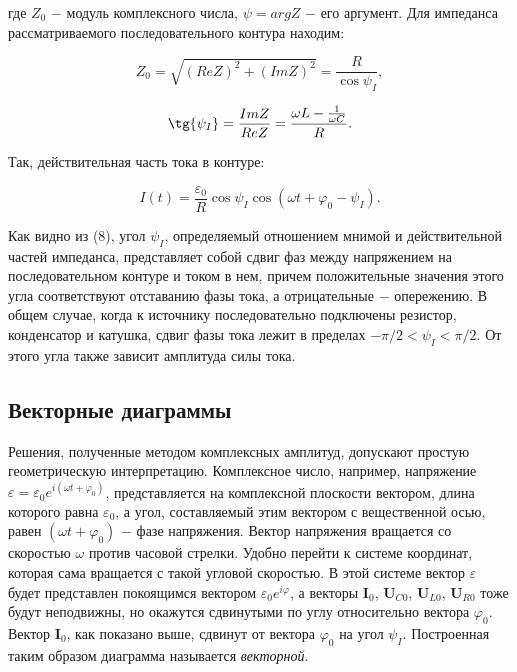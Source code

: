 \documentclass[a4paper,12pt]{article} %
\begin{document}
\hfill \break где $Z_{0}$ $-$ модуль комплексного числа, $\psi = arg Z$ $-$ его аргумент. Для импеданса рассматриваемого последовательного контура находим:

\begin{equation}\label{ linkname }
Z_{0} = \sqrt{(Re Z)^2 + (Im Z)^2} = \frac{R}{\cos{\psi_{I}}},
\end{equation}

\begin{equation}\label{ linkname }
\tg{\psi_{I}} = \frac{Im Z}{Re Z} = \frac{\omega L - \frac{1}{\omega C}}{R}.
\end{equation}

\hfill \break Так, действительная часть тока в контуре:

\begin{equation}\label{ linkname }
I(t) = \frac{\varepsilon_{0}}{R} \cos{\psi_{I}} \cos({\omega t + \varphi_{0} - \psi_{I}}).
\end{equation}

\hfill \break Как видно из (8), угол $\psi_{I}$, определяемый отношением мнимой и действительной частей импеданса, представляет собой сдвиг фаз между напряжением на последовательном контуре и током в нем, причем положительные значения этого угла соответствуют отставанию фазы тока, а отрицательные $-$ опережению. В общем случае, когда к источнику последовательно подключены резистор, конденсатор и катушка, сдвиг фазы тока лежит в пределах $-\pi/2 < \psi_{I} < \pi/2$. От этого угла также зависит амплитуда силы тока.

\subsection{Векторные диаграммы}
\hfill \break Решения, полученные методом комплексных амплитуд, допускают простую геометрическую интерпретацию. Комплексное число, например, напряжение $\varepsilon =\varepsilon_{0}e^{i(\omega t + \varphi_{0})}$, представляется на комплексной плоскости вектором, длина которого равна $\varepsilon_{0}$, а угол, составляемый этим вектором с  вещественной осью, равен $(\omega t + \varphi_{0})$ $-$ фазе напряжения. Вектор напряжения вращается со скоростью $\omega$ против часовой стрелки. Удобно перейти к системе координат, которая сама вращается с такой угловой скоростью. В этой системе вектор $\varepsilon$ будет представлен покоящимся вектором $\varepsilon_{0}e^{i \varphi}$, а векторы $\textbf{I}_{0}$, $\textbf{U}_{C0}$, $\textbf{U}_{L0}$, $\textbf{U}_{R0}$ тоже будут неподвижны, но окажутся сдвинутыми по углу относительно вектора $\varphi_{0}$. Вектор $\textbf{I}_{0}$, как показано выше, сдвинут от вектора $\varphi_{0}$ на угол $\psi_{I}$. Построенная таким образом диаграмма называется \textit{векторной}.
\end{document}
